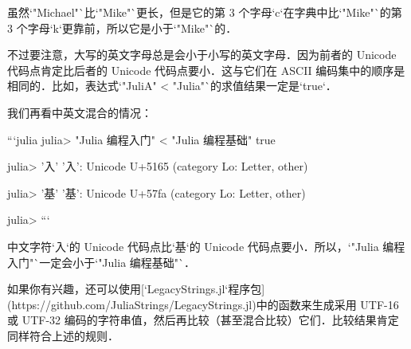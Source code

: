 虽然`"Michael"`比`"Mike"`更长，但是它的第 3 个字母`c`在字典中比`"Mike"`的第 3 个字母`k`更靠前，所以它是小于`"Mike"`的．

不过要注意，大写的英文字母总是会小于小写的英文字母．因为前者的 Unicode 代码点肯定比后者的 Unicode 代码点要小．这与它们在 ASCII 编码集中的顺序是相同的．比如，表达式`"JuliA" < "Julia"`的求值结果一定是`true`．

我们再看中英文混合的情况：

```julia
julia> "Julia 编程入门" < "Julia 编程基础"
true

julia> '入'
'入': Unicode U+5165 (category Lo: Letter, other)

julia> '基'
'基': Unicode U+57fa (category Lo: Letter, other)

julia> 
```

中文字符`入`的 Unicode 代码点比`基`的 Unicode 代码点要小．所以，`"Julia 编程入门"`一定会小于`"Julia 编程基础"`．

如果你有兴趣，还可以使用[`LegacyStrings.jl`程序包](https://github.com/JuliaStrings/LegacyStrings.jl)中的函数来生成采用 UTF-16 或 UTF-32 编码的字符串值，然后再比较（甚至混合比较）它们．比较结果肯定同样符合上述的规则．
